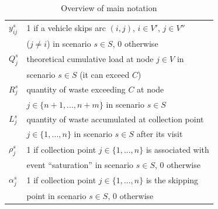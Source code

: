 \documentclass[authoryear,preprint,12pt]{elsarticle}
\begin{document}
\begin{table}[h!]
\begin{tabular}{ll}
 $y_{ij}^s$ & 1 if a vehicle skips arc $(i,j)$, $i\in V'$, $j\in V''$\\ & ($j\neq i$) in scenario $s \in S$, $0$ otherwise\\ 
$Q_j^s$ & theoretical cumulative load at node $j\in V$ in\\ & scenario $s \in S$ (it can exceed $C$)\\
$R_j^s$ & quantity of waste exceeding $C$ at node \\ & $j\in \{n+1,...,n+m\}$ in scenario $s \in S$\\
$L_j^s$ & quantity of waste accumulated at collection point \\ & $j\in \{1,...,n\}$ in scenario $s \in S$  after its visit \\
$\rho_j^s$ & 1 if collection point $j\in \{1,...,n\}$ is associated with \\ & event ``saturation'' in scenario $s\in S$, $0$ otherwise\\ 
$\alpha_j^s$ & 1 if collection point $j\in \{1,...,n\}$ is the skipping \\ & point in scenario $s\in S$, $0$ otherwise\\
\hline
		\end{tabular}
				\caption{Overview of main notation}
				\label{tab_notation}
	\end{table}
	
\end{document}
